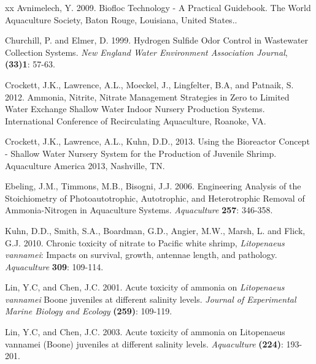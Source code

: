 \documentclass[useAMS,usenatbib]{tellus}
\begin{document}
\begin{thebibliography}{xx}
Avnimelech, Y. 2009. {Biofloc Technology - A Practical Guidebook. The World Aquaculture Society, Baton Rouge, Louisiana, United States.}.

Churchill, P. and Elmer, D. 1999. {Hydrogen Sulfide Odor Control in Wastewater Collection Systems}. {\em New England Water Environment Association Journal}, {\bf (33)1}: 57-63.

Crockett, J.K., Lawrence, A.L., Moeckel, J., Lingfelter, B.A, and Patnaik, S. 2012. {Ammonia, Nitrite, Nitrate Management Strategies in Zero to Limited Water Exchange Shallow Water Indoor Nursery Production Systems.} {International Conference of Recirculating Aquaculture, Roanoke, VA}.

Crockett, J.K., Lawrence, A.L., Kuhn, D.D., 2013. {Using the Bioreactor Concept - Shallow Water Nursery System for the Production of Juvenile Shrimp.} Aquaculture America 2013, Nashville, TN.

Ebeling, J.M., Timmons, M.B., Bisogni, J.J. 2006. {Engineering Analysis of the
Stoichiometry of Photoautotrophic, Autotrophic, and Heterotrophic Removal of Ammonia-Nitrogen in Aquaculture Systems.} {\em Aquaculture} {\bf 257}: 346-358.

Kuhn, D.D., Smith, S.A., Boardman, G.D., Angier, M.W., Marsh, L. and Flick, G.J. 2010. {Chronic toxicity of nitrate to Pacific white shrimp, \textit{Litopenaeus vannamei}: Impacts on survival, growth, antennae length, and pathology.} {\em Aquaculture} {\bf 309}: 109-114.

Lin, Y.C, and Chen, J.C. 2001. {Acute toxicity of ammonia on \textit{Litopenaeus vannamei} Boone juveniles at different salinity levels.} {\em Journal of Experimental Marine Biology and Ecology} {\bf(259)}: 109-119.

Lin, Y.C, and Chen, J.C. 2003. {Acute toxicity of ammonia on Litopenaeus vannamei (Boone) juveniles at different salinity levels.} {\em Aquaculture} {\bf(224)}: 193-201.


\end{thebibliography}
\end{document}
